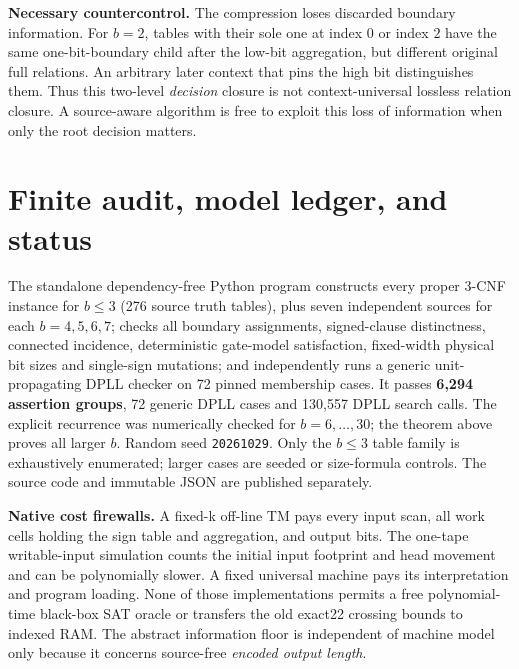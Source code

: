 \documentclass[11pt]{article}
\begin{document}
\textbf{Necessary countercontrol.} The compression loses discarded boundary information. For $b=2$, tables with their sole one at index $0$ or index $2$ have the same one-bit-boundary child after the low-bit aggregation, but different original full relations. An arbitrary later context that pins the high bit distinguishes them. Thus this two-level \emph{decision} closure is not context-universal lossless relation closure. A source-aware algorithm is free to exploit this loss of information when only the root decision matters.

\section{Finite audit, model ledger, and status}
The standalone dependency-free Python program constructs every proper 3-CNF instance for $b\le3$ (276 source truth tables), plus seven independent sources for each $b=4,5,6,7$; checks all boundary assignments, signed-clause distinctness, connected incidence, deterministic gate-model satisfaction, fixed-width physical bit sizes and single-sign mutations; and independently runs a generic unit-propagating DPLL checker on 72 pinned membership cases. It passes \textbf{6,294 assertion groups}, 72 generic DPLL cases and 130,557 DPLL search calls. The explicit recurrence was numerically checked for $b=6,\ldots,30$; the theorem above proves all larger $b$. Random seed \texttt{20261029}. Only the $b\le3$ table family is exhaustively enumerated; larger cases are seeded or size-formula controls. The source code and immutable JSON are published separately.

\noindent\textbf{Native cost firewalls.} A fixed-k off-line TM pays every input scan, all work cells holding the sign table and aggregation, and output bits. The one-tape writable-input simulation counts the initial input footprint and head movement and can be polynomially slower. A fixed universal machine pays its interpretation and program loading. None of those implementations permits a free polynomial-time black-box SAT oracle or transfers the old exact22 crossing bounds to indexed RAM. The abstract information floor is independent of machine model only because it concerns source-free \emph{encoded output length}.
\end{document}
